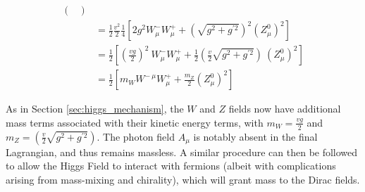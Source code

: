 \begin{equation}
\begin{split}
\begin{pmatrix}
            \end{pmatrix} \\
        & = \frac{1}{2} \frac{v^2}{2} \frac{1}{4} 
            \left[ 2 g^2  W^-_{\mu} W^+_{\mu}
            + \left(\sqrt{g^2 + g^{\prime 2}}\right)^2 (Z^0_{\mu})^2 \right] \\
        & = \frac{1}{2} \left[ \left(\frac{vg}{2}\right)^2\  W^-_{\mu} W^+_{\mu}
            + \frac{1}{2} \left(\frac{v}{2}\sqrt{g^2 + g^{\prime 2}}\right)\ (Z^0_{\mu})^2 \right] \\
        & = \frac{1}{2} \left[ m_W W^{-\ \mu} W^+_{\mu} + \frac{m_Z}{2} (Z^0_{\mu})^2 \right]
    \end{split} \end{equation}

    As in Section \ref{sec:higgs_mechanism}, the $W$ and $Z$ fields now have additional mass terms associated with their kinetic energy terms,
        with $m_W = \frac{vg}{2}$ and $m_Z = \left(\frac{v}{2}\sqrt{g^2 + g^{\prime 2}}\right) $.
    The photon field $A_{\mu}$ is notably absent in the final Lagrangian, and thus remains massless.
    A similar procedure can then be followed to allow the Higgs Field to interact with fermions
        (albeit with complications arising from mass-mixing and chirality),
        which will grant mass to the Dirac fields.





